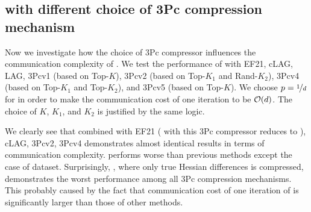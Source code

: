 \documentclass[11pt]{article}
\begin{document}
	\subsection{ with different choice of 3Pc compression mechanism}
	
	Now we investigate how the choice of 3Pc compressor influences the communication complexity of . We test the performance of  with EF21, cLAG, LAG, 3Pcv1 (based on Top-$K$), 3Pcv2 (based on Top-$K_1$ and Rand-$K_2$), 3Pcv4 (based on Top-$K_1$ and Top-$K_2$), and 3Pcv5 (based on Top-$K$). We choose $p=\nicefrac{1}{d}$ for  in order to make the communication cost of one iteration to be $\mathcal{O}(d)$. The choice of $K$, $K_1$, and $K_2$ is justified by the same logic. 
	
	We clearly see that  combined with EF21 ( with this 3Pc compressor reduces to ), cLAG, 3Pcv2, 3Pcv4 demonstrates almost identical results in terms of communication complexity.  performs worse than previous methods except the case of  dataset. Surprisingly, , where only true Hessian differences is compressed, demonstrates the worst performance among all 3Pc compression mechanisms. This probably caused by the fact that communication cost of one iteration of  is significantly larger than those of other  methods.
	
	
	
\end{document}
